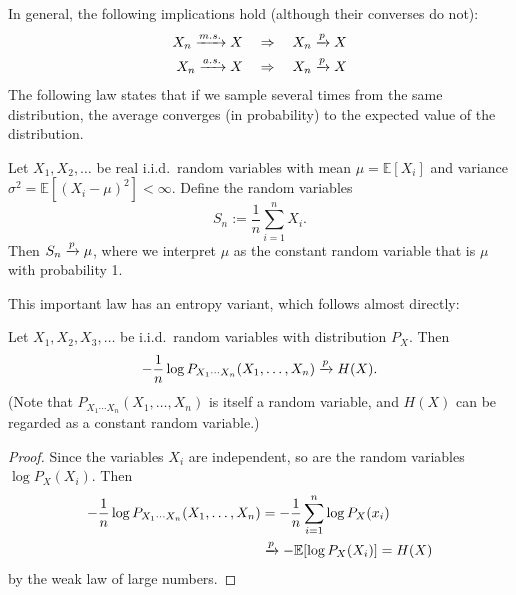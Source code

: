 In general, the following implications hold (although their converses do not):
\begin{align}
X_n \xrightarrow{m.s.} X \ \ \ &\Rightarrow\ \ \  X_n \xrightarrow{p} X\\
X_n \xrightarrow{a.s.} X \ \ \ &\Rightarrow\ \ \  X_n \xrightarrow{p} X
\end{align}
The following law states that if we sample several times from the same distribution, the average converges (in probability) to the expected value of the distribution.
\begin{theorem}
Let $X_1, X_2, \ldots$ be real i.i.d.\ random variables with mean $\mu = \mathbb{E}[X_i]$ and variance $\sigma^2 = \mathbb{E}[(X_i - \mu)^2] < \infty$. Define the random variables
\[
S_n := \frac{1}{n} \sum_{i=1}^n X_i.
\]
Then $S_n \xrightarrow{p} \mu$, where we interpret $\mu$ as the constant random variable that is $\mu$ with probability 1.
\end{theorem}
This important law has an entropy variant, which follows almost directly:
\begin{theorem}\label{thm:aep}
Let $X_1, X_2, X_3, \ldots$ be i.i.d.\ random variables with distribution $P_X$. Then
\[
-\frac{1}{n} \log P_{X_1 \cdots X_n}(X_1, \ldots, X_n) \xrightarrow{p} H(X).
\]
(Note that $P_{X_1 \cdots X_n}(X_1, \ldots, X_n)$ is itself a random variable, and $H(X)$ can be regarded as a constant random variable.)
\end{theorem}
\begin{proof}
Since the variables $X_i$ are independent, so are the random variables $\log P_X(X_i)$. Then
\begin{align}
-\frac{1}{n} \log P_{X_1\cdots X_n}(X_1, \ldots, X_n) &= -\frac{1}{n} \sum_{i=1}^n \log P_X(x_i)\nonumber\\
&\xrightarrow{p} - \mathbb{E}[\log P_X(X_i)] = H(X)
\end{align}
by the weak law of large numbers.
\end{proof}

